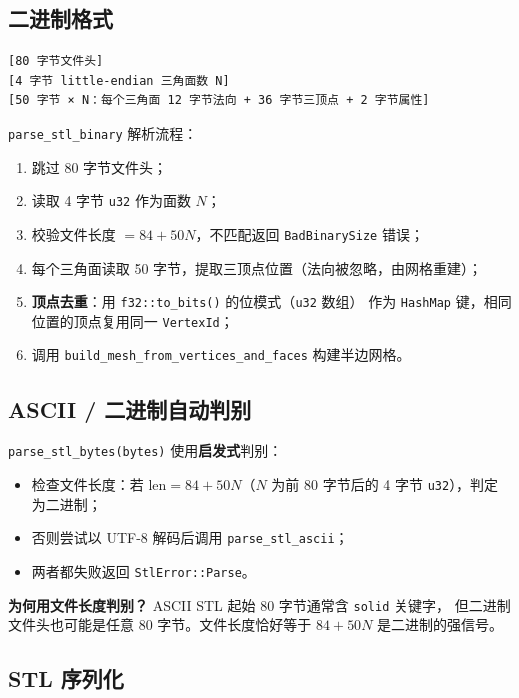 \documentclass[11pt,a4paper]{article}
\begin{document}
\subsection{二进制格式}

\begin{lstlisting}
[80 字节文件头]
[4 字节 little-endian 三角面数 N]
[50 字节 × N：每个三角面 12 字节法向 + 36 字节三顶点 + 2 字节属性]
\end{lstlisting}

\texttt{parse\_stl\_binary} 解析流程：
\begin{enumerate}
  \item 跳过 80 字节文件头；
  \item 读取 4 字节 \texttt{u32} 作为面数 $N$；
  \item 校验文件长度 $= 84 + 50N$，不匹配返回 \texttt{BadBinarySize} 错误；
  \item 每个三角面读取 50 字节，提取三顶点位置（法向被忽略，由网格重建）；
  \item \textbf{顶点去重}：用 \texttt{f32::to\_bits()} 的位模式（\texttt{u32} 数组）
        作为 \texttt{HashMap} 键，相同位置的顶点复用同一 \texttt{VertexId}；
  \item 调用 \texttt{build\_mesh\_from\_vertices\_and\_faces} 构建半边网格。
\end{enumerate}

\subsection{ASCII / 二进制自动判别}

\texttt{parse\_stl\_bytes(bytes)} 使用\textbf{启发式}判别：
\begin{itemize}
  \item 检查文件长度：若 $\text{len} = 84 + 50N$（$N$ 为前 80 字节后的 4 字节
        \texttt{u32}），判定为二进制；
  \item 否则尝试以 UTF-8 解码后调用 \texttt{parse\_stl\_ascii}；
  \item 两者都失败返回 \texttt{StlError::Parse}。
\end{itemize}

\textbf{为何用文件长度判别？} ASCII STL 起始 80 字节通常含 \texttt{solid} 关键字，
但二进制文件头也可能是任意 80 字节。文件长度恰好等于 $84 + 50N$ 是二进制的强信号。

\subsection{STL 序列化}
\end{document}
